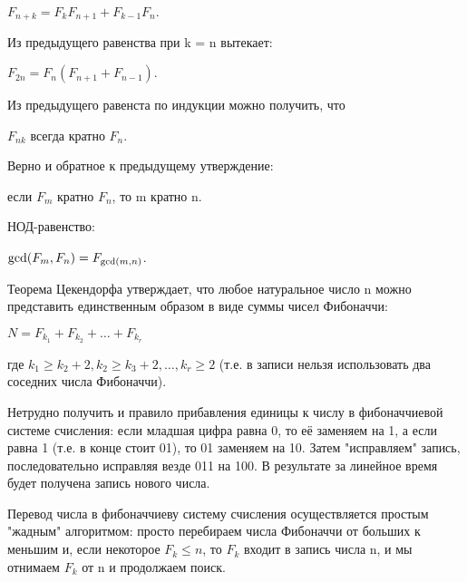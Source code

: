 \documentclass[a4paper]{article}
\begin{document}
\begin{multicols*}{2}
		 $F_{n+k} = F_k F_{n+1} + F_{k-1} F_n.$ 
		 
		 Из предыдущего равенства при k = n вытекает:
		 
		 $F_{2n} = F_n (F_{n+1} + F_{n-1}).$ 
		 
		 Из предыдущего равенста по индукции можно получить, что
		 
		 $F_{nk}$ всегда кратно $F_n$.
		 
		 Верно и обратное к предыдущему утверждение:
		 
		 если $F_m$ кратно $F_n$, то m кратно n.
		 
		 НОД-равенство:
		 
		 ${\rm gcd} (F_m, F_n) = F_{{\rm gcd} (m, n)}$. 
		 
		 Теорема Цекендорфа утверждает, что любое натуральное число n можно представить единственным образом в виде суммы чисел Фибоначчи:
		 
		 $N = F_{k_1} + F_{k_2} + \ldots + F_{k_r}$
		 
		 где $k_1 \ge k_2+2, k_2 \ge k_3+2, \ldots, k_r \ge 2$ (т.е. в записи нельзя использовать два соседних числа Фибоначчи).
		 
		 Нетрудно получить и правило прибавления единицы к числу в фибоначчиевой системе счисления: если младшая цифра равна 0, то её заменяем на 1, а если равна 1 (т.е. в конце стоит 01), то 01 заменяем на 10. Затем "исправляем" запись, последовательно исправляя везде 011 на 100. В результате за линейное время будет получена запись нового числа.
		 
		 Перевод числа в фибоначчиеву систему счисления осуществляется простым "жадным" алгоритмом: просто перебираем числа Фибоначчи от больших к меньшим и, если некоторое $F_k \le n$, то $F_k$ входит в запись числа n, и мы отнимаем $F_k$ от n и продолжаем поиск.
		 
		 
	\end{multicols*}
\end{document}
